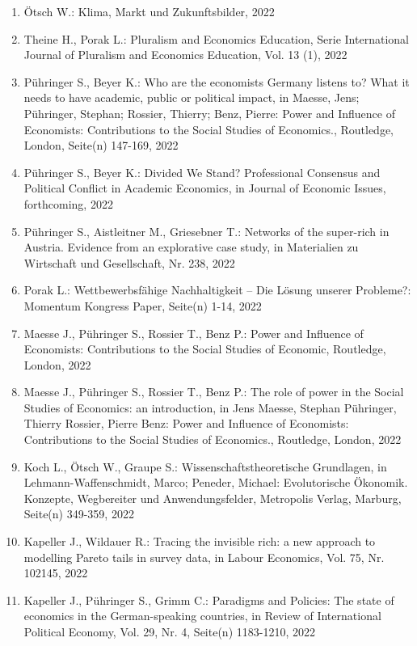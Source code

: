 \begin{enumerate}
    	 \item Ötsch W.: Klima, Markt und Zukunftsbilder, 2022
	 \item Theine H., Porak L.: Pluralism and Economics Education, Serie International Journal of Pluralism and Economics Education, Vol. 13 (1), 2022
	 \item Pühringer S., Beyer K.: Who are the economists Germany listens to? What it needs to have academic, public or political impact, in Maesse, Jens; Pühringer, Stephan; Rossier, Thierry; Benz, Pierre: Power and Influence of Economists: Contributions to the Social Studies of Economics., Routledge, London, Seite(n) 147-169, 2022
	 \item Pühringer S., Beyer K.: Divided We Stand? Professional Consensus and Political Conflict in Academic Economics, in Journal of Economic Issues, forthcoming, 2022
	 \item Pühringer S., Aistleitner M., Griesebner T.: Networks of the super-rich in Austria. Evidence from an explorative case study, in Materialien zu Wirtschaft und Gesellschaft, Nr. 238, 2022
	 \item Porak L.: Wettbewerbsfähige Nachhaltigkeit – Die Lösung unserer Probleme?: Momentum Kongress Paper, Seite(n) 1-14, 2022
	 \item Maesse J., Pühringer S., Rossier T., Benz P.: Power and Influence of Economists: Contributions to the Social Studies of Economic, Routledge, London, 2022
	 \item Maesse J., Pühringer S., Rossier T., Benz P.: The role of power in the Social Studies of Economics: an introduction, in Jens Maesse, Stephan Pühringer, Thierry Rossier,  Pierre Benz: Power and Influence of Economists: Contributions to the Social Studies of Economics., Routledge, London, 2022
	 \item Koch L., Ötsch W., Graupe S.: Wissenschaftstheoretische Grundlagen, in Lehmann-Waffenschmidt, Marco; Peneder, Michael: Evolutorische Ökonomik. Konzepte, Wegbereiter und Anwendungsfelder, Metropolis Verlag, Marburg, Seite(n) 349-359, 2022
	 \item Kapeller J., Wildauer R.: Tracing the invisible rich: a new approach to modelling Pareto tails in survey data, in Labour Economics, Vol. 75, Nr. 102145, 2022
	 \item Kapeller J., Pühringer S., Grimm C.: Paradigms and Policies: The state of economics in the German-speaking countries, in Review of International Political Economy, Vol. 29, Nr. 4, Seite(n) 1183-1210, 2022

\end{enumerate}
